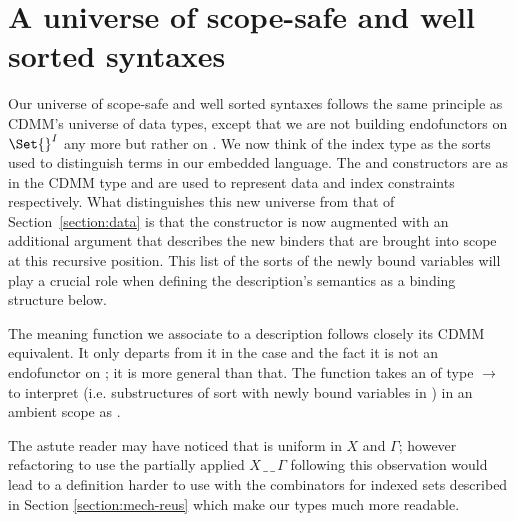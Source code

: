 \section{A universe of scope-safe and well sorted syntaxes}\label{section:universe}

Our universe of scope-safe and well sorted syntaxes follows the same principle
as CDMM's universe of data types, except that we are not building endofunctors on
$\Set{}^I$ any more but rather on { }. We now think of the
index type  as the sorts
used to distinguish terms in our embedded language. The  and
 constructors are as in the CDMM  type and are used to
represent data and index constraints respectively.
What distinguishes this new universe  from that of Section~\ref{section:data}
is that the
 constructor
is now augmented with an additional { } argument that describes
the new binders that are brought into scope at this recursive position. This
list of the sorts of the newly bound variables will play a crucial role when
defining the description's semantics as a binding structure below. %

\begin{center}
\end{center}

The meaning function  we associate to a description follows closely
its CDMM equivalent. It only departs from it in the  case and the fact
it is not an endofunctor on  ; it is more general than that.
The function takes an  of type {  $\rightarrow$  }
to interpret {  } (i.e. substructures of sort  with
newly bound variables in ) in an ambient scope  as {   }.

\begin{center}
\end{center}

The astute reader may have noticed that  is uniform in $X$ and $\Gamma$; however
refactoring  to use the partially applied $X\,\_\,\_\,\Gamma$ following
this observation would lead to a definition harder to use with the
combinators for indexed sets described in Section \ref{section:mech-reus}
which make our types much more readable.

